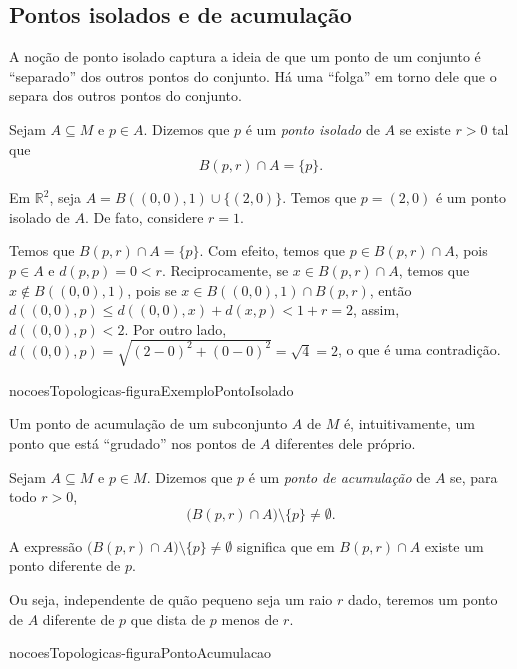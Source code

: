 \subsection{Pontos isolados e de acumulação}

A noção de ponto isolado captura a ideia de que um ponto de um conjunto é ``separado'' dos outros pontos do conjunto.
Há uma ``folga'' em torno dele que o separa dos outros pontos do conjunto.

\begin{definition}
    Sejam $A\subseteq M$ e $p \in A$.
    Dizemos que $p$ é um \emph{ponto isolado} de $A$ se existe $r>0$ tal que
    \[
        B(p, r)\cap A = \{p\}.
    \]
\end{definition}

\begin{example}
    Em $\mathbb R^2$, seja $A = B((0,0), 1)\cup \{(2, 0)\}$.
    Temos que $p=(2, 0)$ é um ponto isolado de $A$.
    De fato, considere $r=1$.
    
    Temos que $B(p, r)\cap A=\{p\}$.
    Com efeito, temos que $p\in B(p, r)\cap A$, pois $p \in A$ e $d(p, p) = 0 < r$.
    Reciprocamente, se $x \in B(p, r)\cap A$, temos que $x\notin B((0,0), 1)$, pois se $x \in B((0,0), 1)\cap B(p, r)$, então $d((0,0), p) \leq d((0,0), x) + d(x, p) < 1 + r = 2$, assim, $d((0,0), p)<2$.
    Por outro lado, $d((0,0), p)=\sqrt{(2-0)^2 + (0-0)^2} = \sqrt{4} = 2$, o que é uma contradição.
\end{example}

{nocoesTopologicas-figuraExemploPontoIsolado}

Um ponto de acumulação de um subconjunto $A$ de $M$ é, intuitivamente, um ponto que está ``grudado'' nos pontos de $A$ diferentes dele próprio.

\begin{definition}
    Sejam $A\subseteq M$ e $p \in M$.
    Dizemos que $p$ é um \emph{ponto de acumulação} de $A$ se, para todo $r>0$,
    \[
        \bigl(B(p, r)\cap A\bigr)\setminus\{p\}\neq \emptyset.
    \]
\end{definition}

A expressão $\bigl(B(p, r)\cap A\bigr)\setminus\{p\}\neq\emptyset$ significa que em $B(p, r)\cap A$ existe um ponto diferente de $p$.

Ou seja, independente de quão pequeno seja um raio $r$ dado, teremos um ponto de $A$ diferente de $p$ que dista de $p$ menos de $r$.

{nocoesTopologicas-figuraPontoAcumulacao}

